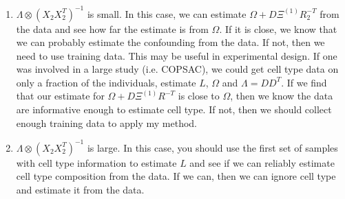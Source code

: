\documentclass{article}
\begin{document}
\begin{enumerate}
\item $\Lambda \otimes \left( X_2 X_2^T \right)^{-1}$ is small. In this case, we can estimate $\Omega + D\Xi^{(1)}R_2^{-T}$ from the data and see how far the estimate is from $\Omega$. If it is close, we know that we can probably estimate the confounding from the data. If not, then we need to use training data. This may be useful in experimental design. If one was involved in a large study (i.e. COPSAC), we could get cell type data on only a fraction of the individuals, estimate $L$, $\Omega$ and $\Lambda = DD^T$. If we find that our estimate for $\Omega + D\Xi^{(1)}R^{-T}$ is close to $\Omega$, then we know the data are informative enough to estimate cell type. If not, then we should collect enough training data to apply my method.

\item $\Lambda \otimes \left( X_2 X_2^T \right)^{-1}$ is large. In this case, you should use the first set of samples with cell type information to estimate $L$ and see if we can reliably estimate cell type composition from the data. If we can, then we can ignore cell type and estimate it from the data.
\end{enumerate}
\end{document}
